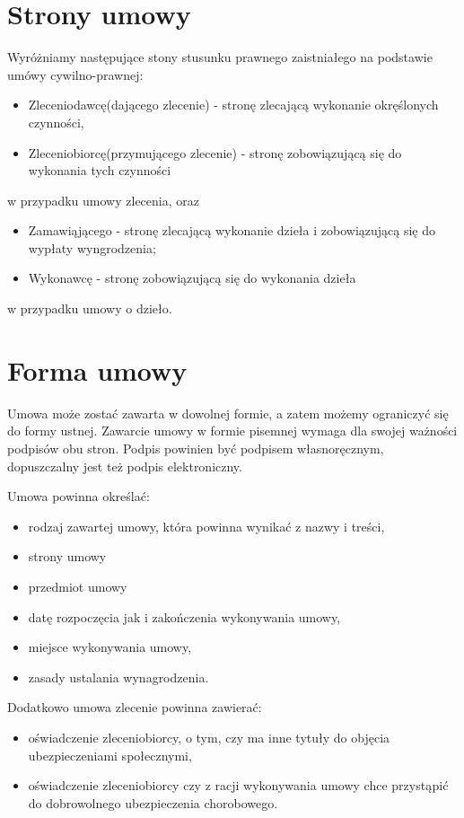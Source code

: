 \section[Strony umowy][Strony umowy]{Strony umowy}
Wyróżniamy następujące stony stusunku prawnego zaistniałego na podstawie umówy cywilno-prawnej:
\begin{itemize}
	\item Zleceniodawcę(dającego zlecenie) - stronę zlecającą wykonanie okręślonych czynności,
	\item Zleceniobiorcę(przymującego zlecenie) - stronę zobowiązującą się do wykonania tych czynności
\end{itemize}
w przypadku umowy zlecenia, oraz
\begin{itemize}
	\item Zamawiąjącego - stronę zlecającą wykonanie dzieła i zobowiązującą się do wypłaty wyngrodzenia;
	\item Wykonawcę - stronę zobowiązującą się do wykonania dzieła
\end{itemize}
w przypadku umowy o dzieło.

\section[Forma umowy][Forma umowy]{Forma umowy}
Umowa może zostać zawarta w dowolnej formie, a zatem możemy ograniczyć się do formy ustnej. Zawarcie umowy w formie pisemnej wymaga dla swojej ważności podpisów obu stron. Podpis powinien być podpisem własnoręcznym, dopuszczalny jest też podpis elektroniczny.

Umowa powinna określać:
\begin{itemize}
\item rodzaj zawartej umowy, która powinna wynikać z nazwy i treści,
\item strony umowy
\item przedmiot umowy
\item datę rozpoczęcia jak i zakończenia wykonywania umowy,
\item miejsce wykonywania umowy,
\item zasady ustalania wynagrodzenia.
\end{itemize}
Dodatkowo umowa zlecenie powinna zawierać:
\begin{itemize}
\item oświadczenie zleceniobiorcy, o tym, czy ma inne tytuły do objęcia ubezpieczeniami społecznymi,
\item oświadczenie zleceniobiorcy czy z racji wykonywania umowy chce przystąpić do dobrowolnego ubezpieczenia chorobowego.
\end{itemize}

